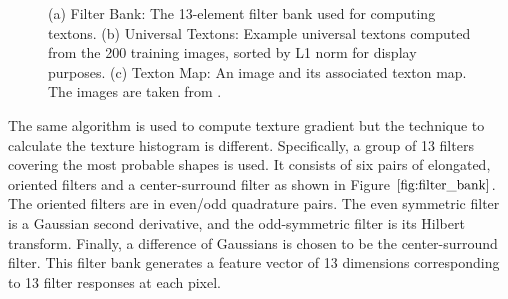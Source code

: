\documentclass{SMBV12}
\begin{document}
\begin{figure}[htbp]
    \centering
    \caption{(a) Filter Bank: The 13-element filter bank used for computing textons. (b) Universal Textons: Example universal textons computed from the 200 training images, sorted by L1 norm for display purposes. (c) Texton Map: An image and its associated texton map. The images are taken from \cite{martin2004learning}.} 
\end{figure}

The same algorithm is used to compute texture gradient but the technique to calculate the texture histogram is different. Specifically, a group of 13 filters covering the most probable shapes is used. It consists of six pairs of elongated, oriented filters and a center-surround filter as shown in Figure $\ref{fig:filter_bank}$. The oriented filters are in even/odd quadrature pairs. The even symmetric filter is a Gaussian second derivative, and the odd-symmetric filter is its Hilbert transform. Finally, a difference of Gaussians is chosen to be the center-surround filter. This filter bank generates a feature vector of 13 dimensions corresponding to 13 filter responses at each pixel.
\end{document}
